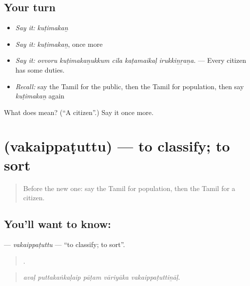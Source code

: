\subsection*{Your turn}
\begin{itemize}
\raggedright
  \item \emph{Say it:} \emph{kuṭimakaṉ}
  \item \emph{Say it:} \emph{kuṭimakaṉ}, once more
  \item \emph{Say it:} \emph{ovvoru kuṭimakaṉukkum cila kaṭamaikaḷ irukkiṉṟaṉa.} — Every citizen has some duties.
  \item \emph{Recall:} say the Tamil for the public, then the Tamil for population, then say \emph{kuṭimakaṉ} again
\end{itemize}

\begin{tcolorbox}[breakable,colback=teal!4,colframe=teal!35!black,title={Before you move on}]
What does  mean? (\textquotedblleft{}A citizen\textquotedblright{}.) Say it once more.
\end{tcolorbox}
\section[\texorpdfstring{\ta{வகைப்படுத்து} (vakaippaṭuttu)}{வகைப்படுத்து (vakaippaṭuttu)}]{ (vakaippaṭuttu) — to classify; to sort}

\label{lesson:TA-C369-vakaippatuttu}



\begin{quote}
Before the new one: say the Tamil for population, then the Tamil for a citizen.
\end{quote}

\subsection*{You'll want to know: }
\textbf{} — \emph{vakaippaṭuttu} — \textquotedblleft{}to classify; to sort\textquotedblright{}.

\begin{quote}
    .
\end{quote}

\begin{quote}
\emph{avaḷ puttakaṅkaḷaip pāṭam vāriyāka vakaippaṭuttiṉāḷ.}
\end{quote}

